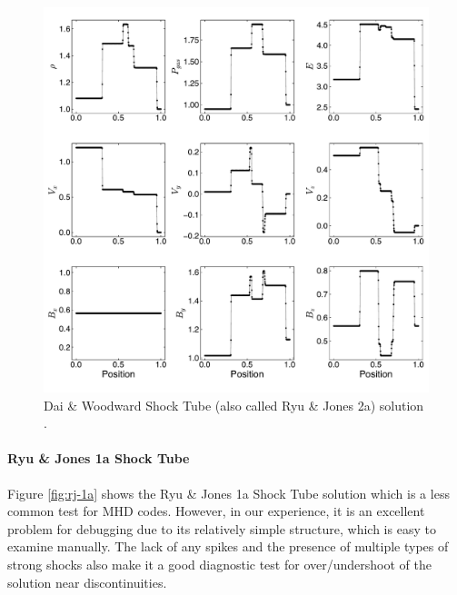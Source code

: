 \documentclass[modern]{aastex631}
\newcommand*{\img}[1]{%
    \raisebox{-.05\baselineskip}{%
        \texttt{[image: \#1]}%
    }%
}
\begin{document}
\begin{figure}[ht!]
    \includegraphics[width=\linewidth]{d-and-w.pdf}
    \caption{Dai \& Woodward Shock Tube (also called Ryu \& Jones 2a) solution \citep{dai_woodward_1998, ryu_jones_1995}.
    \href{https://zenodo.org/records/10927223}{\img{zenodo-gradient-200.png}}}
    \label{fig:dai-and-woodward}
\end{figure}

\paragraph{Ryu \& Jones 1a Shock Tube}
Figure \ref{fig:rj-1a} shows the Ryu \& Jones 1a Shock Tube solution \citep{ryu_jones_1995} which is a less common test for MHD codes. However, in our experience, it is an excellent problem for debugging due to its relatively simple structure, which is easy to examine manually. The lack of any spikes and the presence of multiple types of strong shocks also make it a good diagnostic test for over/undershoot of the solution near discontinuities.
\end{document}
